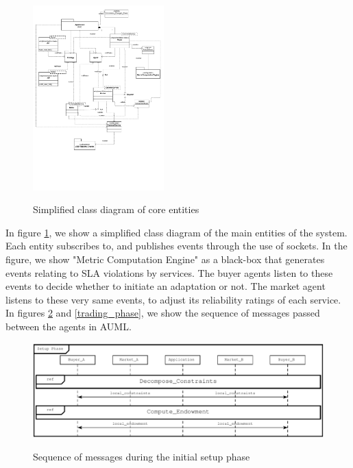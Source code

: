 \documentclass[10pt,journal,compsoc]{IEEEtran}
\begin{document}
\begin{figure}[ht]
	\centering
	\includegraphics[trim = 30mm 50mm 50mm 30mm, clip, totalheight=0.50\textheight, width=0.45\textwidth]{drawings/class_and_package_diagram.pdf}
	\label{class_diagram}
	\caption{Simplified class diagram of core entities}
\end{figure}

In figure \ref{class_diagram}, we show a simplified class diagram of the main entities of the system. Each entity subscribes to, and publishes events through the use of sockets. In the figure, we show "Metric Computation Engine" as a black-box that generates events relating to SLA violations by services. The buyer agents listen to these events to decide whether to initiate an adaptation or not. The market agent listens to these very same events, to adjust its reliability ratings of each service. In figures \ref{setup_phase} and \ref{trading_phase}, we show the sequence of messages passed between the agents in AUML. \\

\begin{figure}
	\centering
	\includegraphics[scale=0.6]{drawings/setup_phase.pdf}
	\label{setup_phase}
	\caption{Sequence of messages during the initial setup phase}
\end{figure}
\end{document}
